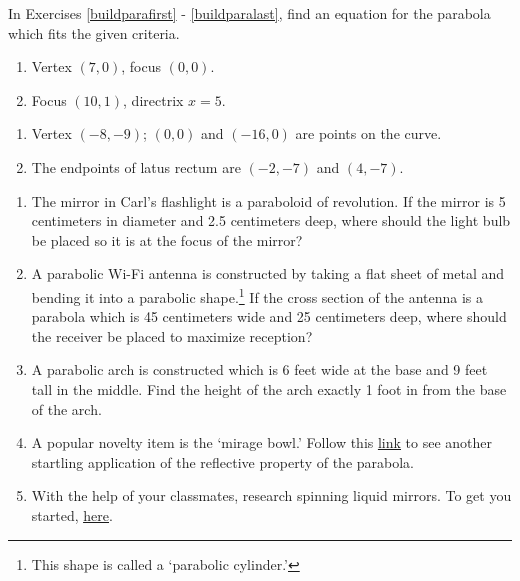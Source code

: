 \documentclass{ximera}
\begin{document}
In Exercises \ref{buildparafirst} - \ref{buildparalast}, find an equation for the parabola which fits the given criteria.

\begin{multicols}{2}
\begin{enumerate}
\setcounter{enumi}{\value{HW}}

\item Vertex $(7, 0)$, focus $(0, 0)$. \label{buildparafirst}
\item Focus $(10, 1)$, directrix $x = 5$.


\setcounter{HW}{\value{enumi}}
\end{enumerate}
\end{multicols}

\begin{enumerate}
\setcounter{enumi}{\value{HW}}


\item Vertex $(-8, -9)$; $(0, 0)$ and $(-16, 0)$ are points on the curve.
\item The endpoints of latus rectum are $(-2, -7)$ and $(4, -7)$.\label{buildparalast}

\setcounter{HW}{\value{enumi}}
\end{enumerate}





\begin{enumerate}
\setcounter{enumi}{\value{HW}}

\item  The mirror in Carl's flashlight is a paraboloid of revolution.  If the mirror is 5 centimeters in diameter and 2.5 centimeters deep, where should the light bulb be placed so it is at the focus of the mirror?

\item  A parabolic Wi-Fi antenna is constructed by taking a flat sheet of metal and bending it into a parabolic shape.\footnote{This shape is called a `parabolic cylinder.'}  If the cross section of the antenna is a parabola which is 45 centimeters wide and 25 centimeters deep, where should the receiver be placed to maximize reception?

\item  \label{parabolaarch} A parabolic arch is constructed which is 6 feet wide at the base and 9 feet tall in the middle. Find the height of the arch exactly 1 foot in from the base of the arch. 

\item  A popular novelty item is the `mirage bowl.'  Follow this  \href{http://spie.org/etop/2007/etop07methodsV.pdf}{\underline{link}} to see another startling application of the reflective property of the parabola.

\item With the help of your classmates, research spinning liquid mirrors.  To get you started,  \href{http://www.astro.ubc.ca/LMT/lzt/}{\underline{here}}.

\end{enumerate}
\end{document}

